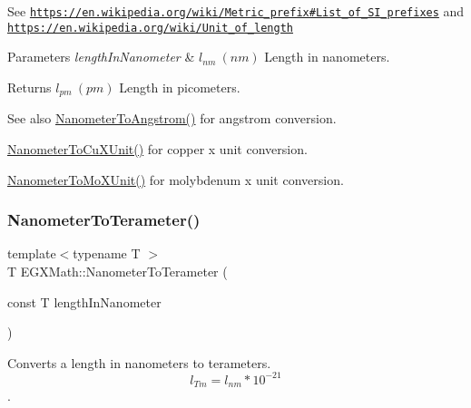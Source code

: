 See \href{https://en.wikipedia.org/wiki/Metric_prefix#List_of_SI_prefixes}{\tt https\+://en.\+wikipedia.\+org/wiki/\+Metric\+\_\+prefix\#\+List\+\_\+of\+\_\+\+S\+I\+\_\+prefixes} and \href{https://en.wikipedia.org/wiki/Unit_of_length}{\tt https\+://en.\+wikipedia.\+org/wiki/\+Unit\+\_\+of\+\_\+length} 
\begin{DoxyParams}{Parameters}
{\em length\+In\+Nanometer} & $ l_{nm}\ (nm)$ Length in nanometers. \\
\hline
\end{DoxyParams}
\begin{DoxyReturn}{Returns}
$ l_{pm}\ (pm)$ Length in picometers. 
\end{DoxyReturn}
\begin{DoxySeeAlso}{See also}
\mbox{\hyperlink{group___e_g_x_math-_conversions-_length_conversions-_nanometer-_non-_s_i_ga7e2062d4cc1a422e54da597c4413efb1}{Nanometer\+To\+Angstrom()}} for angstrom conversion. 

\mbox{\hyperlink{group___e_g_x_math-_conversions-_length_conversions-_nanometer-_non-_s_i_ga59399657caa5a9c81df2ffbe1ff7683c}{Nanometer\+To\+Cu\+X\+Unit()}} for copper x unit conversion. 

\mbox{\hyperlink{group___e_g_x_math-_conversions-_length_conversions-_nanometer-_non-_s_i_gacc6d7fa95c35687718c816df3c95c7b5}{Nanometer\+To\+Mo\+X\+Unit()}} for molybdenum x unit conversion. 
\end{DoxySeeAlso}
\mbox{\label{group___e_g_x_math-_conversions-_length_conversions-_nanometer-_s_i_gacca577403e34659fd6bccf40885704fc}} 
\subsubsection{\texorpdfstring{Nanometer\+To\+Terameter()}{NanometerToTerameter()}}
{\footnotesize\ttfamily template$<$typename T $>$ \\
T E\+G\+X\+Math\+::\+Nanometer\+To\+Terameter (\begin{DoxyParamCaption}\item[{const T}]{length\+In\+Nanometer }\end{DoxyParamCaption})}



Converts a length in nanometers to terameters. \[ l_{Tm}=l_{nm} * 10^{-21} \]. 

